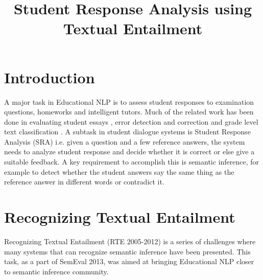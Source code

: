 \documentclass[a4paper]{article}
\title{Student Response Analysis using Textual Entailment}
\begin{document}
\maketitle
\vspace{-1.5cm}
\section{Introduction}
A major task in Educational NLP is to assess student responses to examination questions, homeworks and intelligent tutors. Much of the related work has been done in evaluating student essays \cite{attali}\cite{shermi}, error detection and correction \cite{leacock} and grade level text classification \cite{peterson}. A subtask in student dialogue systems is Student Response Analysis (SRA) i.e. given a question and a few reference answers, the system needs to analyze student response and decide whether it is correct or else give a suitable feedback. A key requirement to accomplish this is semantic inference, for example to detect whether the student answers say the same thing as the reference answer in different words or contradict it.
\section{Recognizing Textual Entailment}
Recognizing Textual Entailment (RTE 2005-2012) is a series of challenges where many systems that can recognize semantic inference have been presented. This task, as a part of SemEval 2013, was aimed at bringing Educational NLP closer to semantic inference community.   
\end{document}
